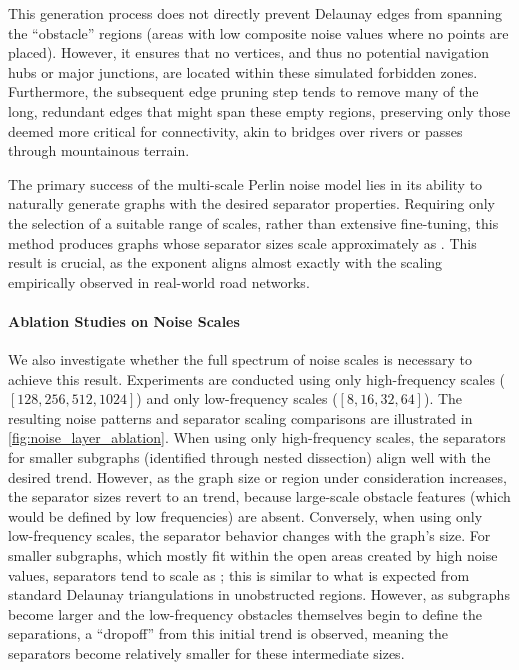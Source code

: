 This generation process does not directly prevent Delaunay edges from spanning the \enquote{obstacle} regions (areas with low composite noise values where no points are placed).
However, it ensures that no vertices, and thus no potential navigation hubs or major junctions, are located within these simulated forbidden zones.
Furthermore, the subsequent edge pruning step tends to remove many of the long, redundant edges that might span these empty regions, preserving only those deemed more critical for connectivity, akin to bridges over rivers or passes through mountainous terrain.

The primary success of the multi-scale Perlin noise model lies in its ability to naturally generate graphs with the desired separator properties.
Requiring only the selection of a suitable range of scales, rather than extensive fine-tuning, this method produces graphs whose separator sizes scale approximately as .
This result is crucial, as the exponent aligns almost exactly with the scaling empirically observed in real-world road networks.


\paragraph{Ablation Studies on Noise Scales}

We also investigate whether the full spectrum of noise scales is necessary to achieve this result.
Experiments are conducted using only high-frequency scales (\([128, 256, 512, 1024]\)) and only low-frequency scales (\([8, 16, 32, 64]\)).
The resulting noise patterns and separator scaling comparisons are illustrated in \cref{fig:noise_layer_ablation}.
When using only high-frequency scales, the separators for smaller subgraphs (identified through nested dissection) align well with the desired trend. However, as the graph size or region under consideration increases, the separator sizes revert to an  trend, because large-scale obstacle features (which would be defined by low frequencies) are absent.
Conversely, when using only low-frequency scales, the separator behavior changes with the graph's size.
For smaller subgraphs, which mostly fit within the open areas created by high noise values, separators tend to scale as ; this is similar to what is expected from standard Delaunay triangulations in unobstructed regions.
However, as subgraphs become larger and the low-frequency obstacles themselves begin to define the separations, a \enquote{dropoff} from this initial  trend is observed, meaning the separators become relatively smaller for these intermediate sizes.

